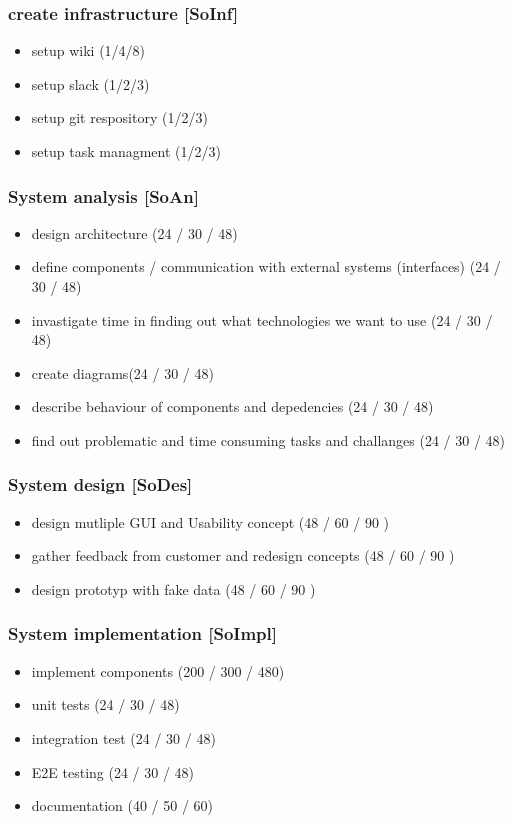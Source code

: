 \subsubsection*{create infrastructure [SoInf]}
\label{sec:org06c00a2}
\begin{itemize}
\item setup wiki (1/4/8)
\item setup slack (1/2/3)
\item setup git respository (1/2/3)
\item setup task managment (1/2/3)
\end{itemize}
\subsubsection*{System analysis [SoAn]}
\label{sec:org498acda}
\begin{itemize}
\item design architecture (24 / 30 / 48)
\item define components / communication with external systems (interfaces) (24 / 30 / 48)
\item invastigate time in finding out what technologies we want to use (24 / 30 / 48)
\item create diagrams(24 / 30 / 48)
\item describe behaviour of components and depedencies (24 / 30 / 48)
\item find out problematic and time consuming tasks and challanges (24 / 30 / 48)
\end{itemize}
\subsubsection*{System design [SoDes]}
\label{sec:org1137d7c}
\begin{itemize}
\item design mutliple GUI and Usability concept (48 / 60 / 90 )
\item gather feedback from customer and redesign concepts (48 / 60 / 90 )
\item design prototyp with fake data (48 / 60 / 90 )
\end{itemize}
\subsubsection*{System implementation [SoImpl]}
\label{sec:orgf2f809f}
\begin{itemize}
\item implement components (200 / 300 / 480)
\item unit tests (24 / 30 / 48)
\item integration test (24 / 30 / 48)
\item E2E testing (24 / 30 / 48)
\item documentation (40 / 50 / 60)
\end{itemize}



